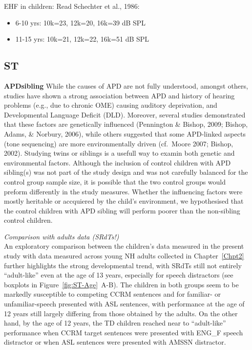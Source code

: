 \documentclass[a4paper, twoside]{templates/ociamthesis}
\begin{document}
EHF in children: Read Schechter et al., 1986:

\begin{itemize}
\item
  6-10 yrs: 10k=23, 12k=20, 16k=39 dB SPL
\item
  11-15 yrs: 10k=21, 12k=22, 16k=51 dB SPL
\end{itemize}

\hypertarget{st-2}{%
\subsection{ST}\label{st-2}}

\begin{correction}
\textbf{APDsibling} While the causes of APD are not fully understood,
amongst others, studies have shown a strong association between APD and
history of hearing problems (e.g., due to chronic OME) causing auditory
deprivation, and Developmental Language Deficit (DLD). Moreover, several
studies demonstrated that these factors are genetically influenced
(Pennington \& Bishop, 2009; Bishop, Adams, \& Norbury, 2006), while
others suggested that some APD-linked aspects (tone sequencing) are more
environmentally driven (cf.~Moore 2007; Bishop, 2002). Studying twins or
siblings is a usefull way to examin both genetic and environmental
factors. Although the inclusion of control children with APD sibling(s)
was not part of the study design and was not carefully balanced for the
control group sample size, it is possible that the two control groups
would preform differently in the study measures. Whether the influencing
factors were mostly heritable or accquiered by the child's environment,
we hypothesised that the control children with APD sibling will perform
poorer than the non-sibling control children.
\end{correction}

\colorbox[HTML]{CCCCFF}{\emph{Comparison with adults data (SRdTs!)}}\\
An exploratory comparison between the children's data measured in the present study with data measured across young NH adults collected in Chapter~\ref{Chpt2} further highlights the strong developmental trend, with SRdTs still not entirely ``adult-like'' even at the age of 13 years, especially for speech distractors (see boxplots in Figure~\ref{fig:ST-Age}~A-B). The children in both groups seem to be markedly susceptible to competing CCRM sentences and for familiar- or unfamiliar-speech presented with ASL sentences, with performance at the age of 12 years still largely differing from those obtained by the adults. On the other hand, by the age of 12 years, the TD children reached near to ``adult-like'' performance when CCRM target sentences were presented with ENG\_F speech distractor or when ASL sentences were presented with AMSSN distractor.\\
\end{document}
